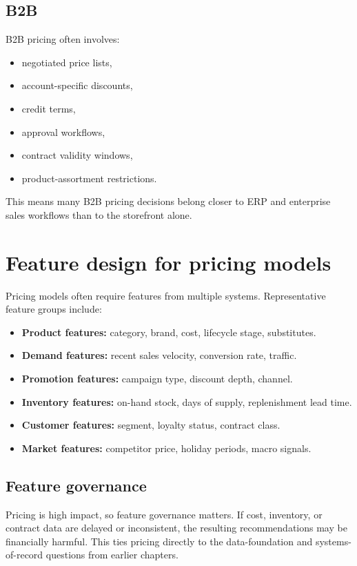 \subsection{B2B}
B2B pricing often involves:
\begin{itemize}
  \item negotiated price lists,
  \item account-specific discounts,
  \item credit terms,
  \item approval workflows,
  \item contract validity windows,
  \item product-assortment restrictions.
\end{itemize}

This means many B2B pricing decisions belong closer to ERP and enterprise sales workflows than to the storefront alone.

\section{Feature design for pricing models}
Pricing models often require features from multiple systems.
Representative feature groups include:
\begin{itemize}
  \item \textbf{Product features:} category, brand, cost, lifecycle stage, substitutes.
  \item \textbf{Demand features:} recent sales velocity, conversion rate, traffic.
  \item \textbf{Promotion features:} campaign type, discount depth, channel.
  \item \textbf{Inventory features:} on-hand stock, days of supply, replenishment lead time.
  \item \textbf{Customer features:} segment, loyalty status, contract class.
  \item \textbf{Market features:} competitor price, holiday periods, macro signals.
\end{itemize}

\subsection{Feature governance}
Pricing is high impact, so feature governance matters.
If cost, inventory, or contract data are delayed or inconsistent, the resulting recommendations may be financially harmful.
This ties pricing directly to the data-foundation and systems-of-record questions from earlier chapters.

